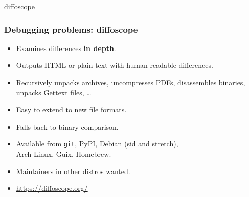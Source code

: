 \documentclass[14pt]{beamer}
\begin{document}
{

\begin{frame}{diffoscope}
 \frametitle{Debugging problems: diffoscope}

 \begin{itemize}
  \item Examines differences \textbf{in depth}.
  \item Outputs HTML or plain text with human readable differences.
  \item Recursively unpacks archives, uncompresses PDFs, disassembles
  binaries, unpacks Gettext files, …
  \item Easy to extend to new file formats.
  \item Falls back to binary comparison.
  \item Available from \texttt{git}, PyPI, Debian (sid and stretch), \\
   Arch Linux, Guix, Homebrew.
  \item Maintainers in other distros wanted.
  \item \url{https://diffoscope.org/}
 \end{itemize}
\end{frame}


}
\end{document}
